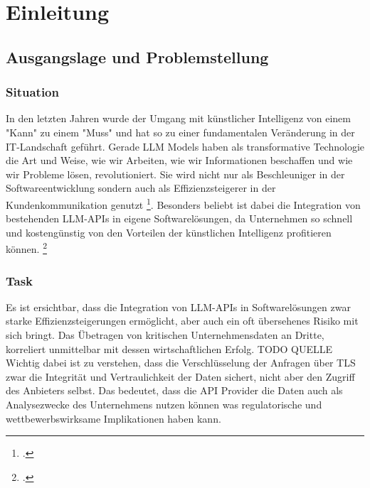 \chapter{Einleitung}


\section{Ausgangslage und Problemstellung}

\subsection{Situation}
In den letzten Jahren wurde der Umgang mit künstlicher Intelligenz von einem "Kann" zu einem "Muss" und
hat so zu einer fundamentalen Veränderung in der IT-Landschaft geführt.
Gerade LLM Models haben als transformative Technologie die Art und Weise, wie wir Arbeiten,
wie wir Informationen beschaffen und wie wir Probleme lösen, revolutioniert. Sie wird nicht nur als Beschleuniger in der Softwareentwicklung
sondern auch als Effizienzsteigerer in der Kundenkommunikation genutzt \footcite{Goodfellow-et-al-2016}.
Besonders beliebt ist dabei die Integration von bestehenden LLM-APIs in eigene Softwarelösungen, da Unternehmen so schnell und kostengünstig
von den Vorteilen der künstlichen Intelligenz profitieren können. \footcite{openai2024gpt4technicalreport}




\subsection{Task}
Es ist ersichtbar, dass die Integration von LLM-APIs in Softwarelösungen zwar starke Effizienzsteigerungen ermöglicht,
aber auch ein oft übersehenes Risiko mit sich bringt. Das Übetragen von kritischen Unternehmensdaten an Dritte, korreliert unmittelbar
mit dessen wirtschaftlichen Erfolg. TODO QUELLE Wichtig dabei ist zu verstehen, dass die Verschlüsselung der Anfragen über TLS zwar die
Integrität und Vertraulichkeit der Daten sichert, nicht aber den Zugriff des Anbieters selbst.
Das bedeutet, dass die API Provider die Daten auch als Analysezwecke des Unternehmens nutzen können was regulatorische
und wettbewerbswirksame Implikationen haben kann.

